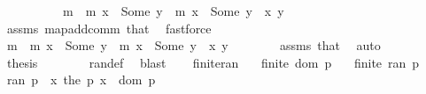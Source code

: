 \begin{isabellebody}
\ \ \isamarkupfalse%
\ {\isacharminus}{\kern0pt}\isanewline
\ \ \ \ \isamarkupfalse%
\ {\isachardoublequoteopen}{\isacharparenleft}{\kern0pt}m{}\ {\isacharplus}{\kern0pt}{\isacharplus}{\kern0pt}\ m{}{\isacharparenright}{\kern0pt}\ x\ {\isacharequal}{\kern0pt}\ Some\ y{\isachardoublequoteclose}\ \ {\isachardoublequoteopen}m{}\ x\ {\isacharequal}{\kern0pt}\ Some\ y{\isachardoublequoteclose}\ \ x\ y\isanewline
\ \ \ \ \ \ \isamarkupfalse%
\ assms\ map{\isacharunderscore}{\kern0pt}add{\isacharunderscore}{\kern0pt}comm\ that\ \isamarkupfalse%
\ fastforce\isanewline
\ \ \ \ \isamarkupfalse%
\ \isamarkupfalse%
\ {\isachardoublequoteopen}{\isacharparenleft}{\kern0pt}m{}\ {\isacharplus}{\kern0pt}{\isacharplus}{\kern0pt}\ m{}{\isacharparenright}{\kern0pt}\ x\ {\isacharequal}{\kern0pt}\ Some\ y{\isachardoublequoteclose}\ \ {\isachardoublequoteopen}m{}\ x\ {\isacharequal}{\kern0pt}\ Some\ y{\isachardoublequoteclose}\ \ x\ y\isanewline
\ \ \ \ \ \ \isamarkupfalse%
\ assms\ that\ \isamarkupfalse%
\ auto\isanewline
\ \ \ \ \isamarkupfalse%
\ \isamarkupfalse%
\ {\isacharquery}{\kern0pt}thesis\isanewline
\ \ \ \ \ \ \isamarkupfalse%
\ ran{\isacharunderscore}{\kern0pt}def\ \isamarkupfalse%
\ blast\isanewline
\ \ \isamarkupfalse%
\isanewline
{}\isamarkupfalse%
%
\endisatagproof
{\isafoldproof}%
%
\isadelimproof
\isanewline
%
\endisadelimproof
\isanewline
{}\isamarkupfalse%
\ finite{\isacharunderscore}{\kern0pt}ran{\isacharcolon}{\kern0pt}\isanewline
\ \ \ {\isachardoublequoteopen}finite\ {\isacharparenleft}{\kern0pt}dom\ p{\isacharparenright}{\kern0pt}{\isachardoublequoteclose}\isanewline
\ \ \ {\isachardoublequoteopen}finite\ {\isacharparenleft}{\kern0pt}ran\ p{\isacharparenright}{\kern0pt}{\isachardoublequoteclose}\isanewline
%
\isadelimproof
%
\endisadelimproof
%
\isatagproof
{}\isamarkupfalse%
\ {\isacharminus}{\kern0pt}\isanewline
\ \ \isamarkupfalse%
\ {\isachardoublequoteopen}ran\ p\ {\isacharequal}{\kern0pt}\ {\isacharparenleft}{\kern0pt}{\isasymlambda}x{\isachardot}{\kern0pt}\ the\ {\isacharparenleft}{\kern0pt}p\ x{\isacharparenright}{\kern0pt}{\isacharparenright}{\kern0pt}\ {\isacharbackquote}{\kern0pt}\ dom\ p{\isachardoublequoteclose}\isanewline

\end{isabellebody}
